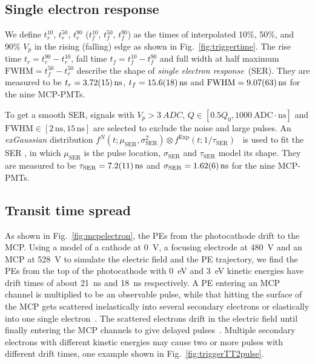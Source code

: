 \subsection{Single electron response}
\label{sec:SER}
We define $t^{10}_r$, $t^{50}_r$, $t^{90}_r$ ($t^{10}_f$, $t^{50}_f$, $t^{90}_f$) as the times of interpolated 10\%, 50\%, and 90\% $V_p$ in the rising (falling) edge as shown in Fig.~\ref{fig:triggertime}.  The rise time $t_r = t^{90}_r - t^{10}_r$, fall time $t_f = t^{10}_f - t^{90}_f$ and full width at half maximum $\mathrm{FWHM} = t^{50}_f - t^{50}_r$ describe the shape of \emph{single electron response}~(SER).  They are measured to be $t_r = \SI{3.72\pm0.15}{ns}$, $t_f = \SI{15.6\pm1.8}{ns}$ and $\mathrm{FWHM} = \SI{9.07\pm0.63}{ns}$ for the nine MCP-PMTs.

To get a smooth SER, signals with $V_p>\SI{3}{ADC}$, $Q \in [0.5Q_0, \SI{1000}{\mathrm{ADC\cdot ns}}]$ and $\mathrm{FWHM} \in [2\,\mathrm{ns}, 15\,\mathrm{ns}]$ are selected to exclude the noise and large pulses. %
An \emph{exGaussian} distribution $f^N(t;\mu_{\mathrm{SER}},\sigma_\mathrm{SER}^2)\otimes f^{\mathrm{Exp}}(t;1/\tau_\mathrm{SER})$~\cite{Luo:2022xrd} is used to fit the SER%
, in which $\mu_{\mathrm{SER}}$ is the pulse location, $\sigma_{\mathrm{SER}}$ and $\tau_{\mathrm{SER}}$ model its shape. They are measured to be $\tau_{\mathrm{SER}} = \SI{7.2\pm1.1}{ns}$ and $\sigma_{\mathrm{SER}} = \SI{1.62\pm0.06}{ns}$ for the nine MCP-PMTs.

\subsection{Transit time spread}
\label{sec:TTS}
As shown in Fig.~\ref{fig:mcpelectron}, the PEs from the photocathode drift to the MCP. Using a model of a cathode at \SI{0}{V}, a focusing electrode at \SI{480}{V} and an MCP at \SI{528}{V} to simulate the electric field and the PE trajectory, we find the PEs from the top of the photocathode with \SI{0}{eV} and \SI{3}{eV} kinetic energies have drift times of about \SI{21}{ns} and \SI{18}{ns} respectively. A PE entering an MCP channel is multiplied to be an observable pulse, while that hitting the surface of the MCP gets scattered inelastically into several secondary electrons or elastically into one single electron~\cite{Furman}. The scattered electrons drift in the electric field until finally entering the MCP channels to give delayed pulses~\cite{KM3NetTesting}. Multiple secondary electrons with different kinetic energies may cause two or more pulses with different drift times, one example shown in Fig.~\ref{fig:triggerTT2pulse}.

